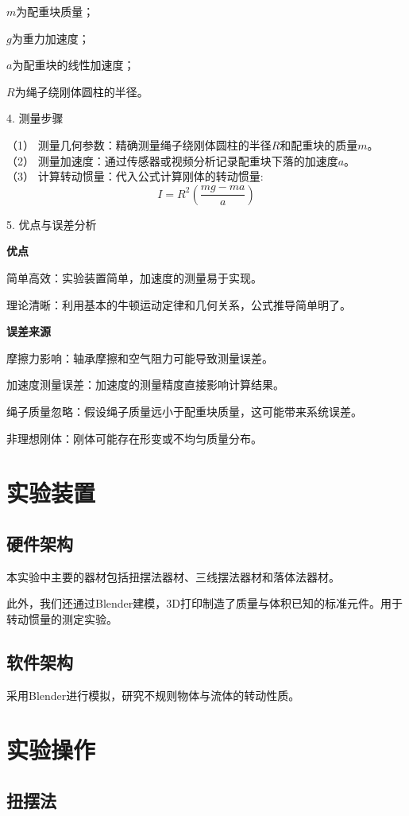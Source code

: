 \documentclass[12pt,hyperref,a4paper,UTF8]{ctexart}
\begin{document}
$m$为配重块质量；

$g$为重力加速度；

$a$为配重块的线性加速度；

$R$为绳子绕刚体圆柱的半径。


4. 测量步骤

（1） 测量几何参数：精确测量绳子绕刚体圆柱的半径$R$和配重块的质量$m$。\\
（2） 测量加速度：通过传感器或视频分析记录配重块下落的加速度$a$。\\
（3） 计算转动惯量：代入公式计算刚体的转动惯量:
$$ I=R^2(\frac{mg-ma}{a}) $$


5. 优点与误差分析

\textbf{优点}

简单高效：实验装置简单，加速度的测量易于实现。

理论清晰：利用基本的牛顿运动定律和几何关系，公式推导简单明了。


\textbf{误差来源}

摩擦力影响：轴承摩擦和空气阻力可能导致测量误差。

加速度测量误差：加速度的测量精度直接影响计算结果。

绳子质量忽略：假设绳子质量远小于配重块质量，这可能带来系统误差。

非理想刚体：刚体可能存在形变或不均匀质量分布。


\section{实验装置}
\subsection{硬件架构}
本实验中主要的器材包括扭摆法器材、三线摆法器材和落体法器材。

此外，我们还通过Blender建模，3D打印制造了质量与体积已知的标准元件。用于转动惯量的测定实验。

\subsection{软件架构}
采用Blender进行模拟，研究不规则物体与流体的转动性质。


\section{实验操作}
\subsection{扭摆法}
\end{document}
